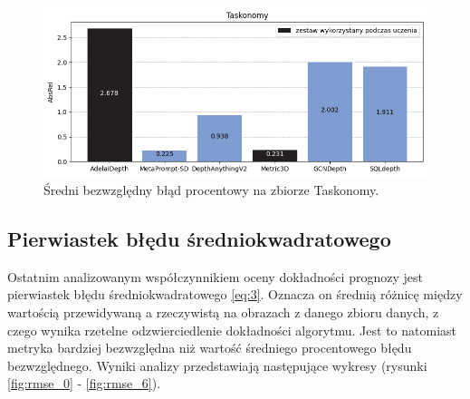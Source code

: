\begin{figure}[H]
    \centering
    \includegraphics{plots/absrel/6}
    \caption{Średni bezwzględny błąd procentowy na zbiorze Taskonomy.}
    \label{fig:absrel_6}
\end{figure}

\subsection{Pierwiastek błędu średniokwadratowego}
Ostatnim analizowanym współczynnikiem oceny dokładności prognozy jest pierwiastek błędu średniokwadratowego \ref{eq:3}. Oznacza on średnią różnicę między wartością przewidywaną a rzeczywistą na obrazach z danego zbioru danych, z czego wynika rzetelne odzwierciedlenie dokładności algorytmu. Jest to natomiast metryka bardziej bezwzględna niż wartość średniego procentowego błędu bezwzględnego. Wyniki analizy przedstawiają następujące wykresy (rysunki \ref{fig:rmse_0} - \ref{fig:rmse_6}).


